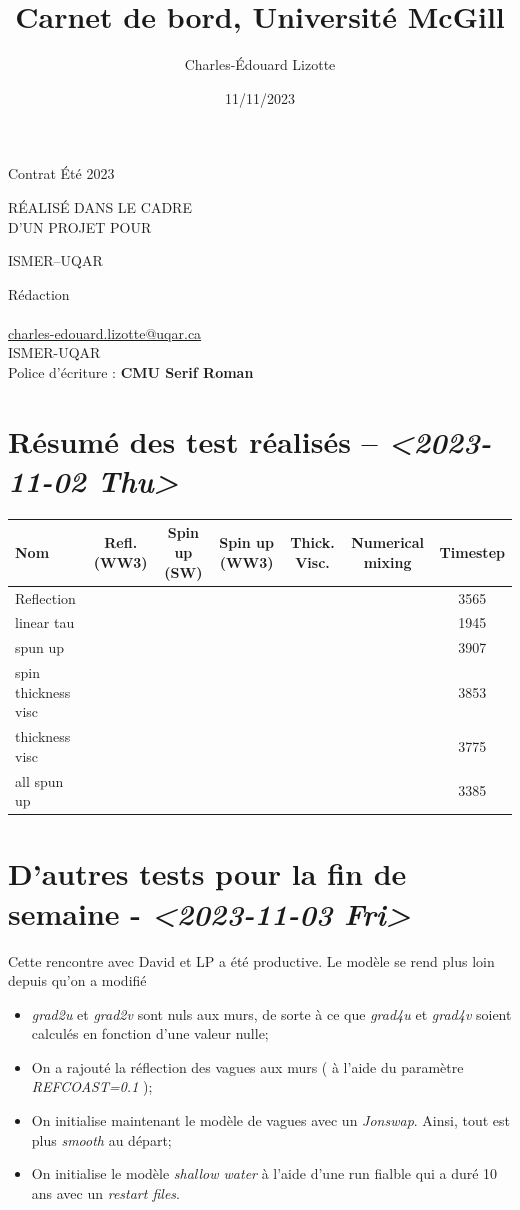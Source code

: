 \documentclass[10pt]{report}
\author{Charles-Édouard Lizotte}
\date{11/11/2023}
\title{Carnet de bord, Université McGill}
\makeatletter
\numberwithin{equation}{section}
\newcommand{\cmark}{\ding{52}}
\newcommand{\xmark}{\ding{55}}
\newcommand{\mytitlepage}{
\begin{titlepage}
\begin{center}
{\Huge Contrat Été 2023 \par}
\vspace{2cm}
{\Huge \MakeUppercase{\thetitle} \par}
\vspace{2cm}
RÉALISÉ DANS LE CADRE\\ D'UN PROJET POUR \par
\vspace{2cm}
{\Huge ISMER--UQAR \par}
\vspace{2cm}
{\thedate}
\end{center}
\vfill
Rédaction \\
{\theauthor}\\
\url{charles-edouard.lizotte@uqar.ca}\\
ISMER-UQAR\\
Police d'écriture : \textbf{CMU Serif Roman}
\end{titlepage}
}
\makeatother
\begin{document}
\mytitlepage
\tableofcontents\newpage

\section{Résumé des test réalisés -- \textit{<2023-11-02 Thu>}}
\label{sec:org900422d}
\begin{center}
\begin{tabular}{lcccccc}
Nom & Refl. (WW3) & Spin up (SW) & Spin up (WW3) & Thick. Visc. & Numerical mixing & Timestep\\[0pt]
\hline
\hline
Reflection & \cmark & \xmark & \cmark & \xmark & \cmark & 3565\\[0pt]
linear tau & \xmark & \xmark & \xmark & \xmark & \cmark & 1945\\[0pt]
spun up & \xmark & \cmark & \xmark & \xmark & \cmark & 3907\\[0pt]
spin thickness visc & \xmark & \cmark & \xmark & \cmark & \xmark & 3853\\[0pt]
thickness visc & \xmark & \xmark & \xmark & \cmark & \xmark & 3775\\[0pt]
all spun up & \cmark & \cmark & \cmark & \xmark & \xmark & 3385\\[0pt]
\hline
\end{tabular}
\end{center}



\section{D'autres tests pour la fin de semaine - \textit{<2023-11-03 Fri>}}
\label{sec:org1665904}

Cette rencontre avec David et LP a été productive.
Le modèle se rend plus loin depuis qu'on a modifié
\begin{itemize}
\item \emph{grad2u} et \emph{grad2v} sont nuls aux murs, de sorte à ce que \emph{grad4u} et \emph{grad4v} soient calculés en fonction d'une valeur nulle;
\item On a rajouté la réflection des vagues aux murs ( à l'aide du paramètre \emph{REFCOAST=0.1} );
\item On initialise maintenant le modèle de vagues avec un \emph{Jonswap}.
Ainsi, tout est plus \emph{smooth} au départ;
\item On initialise le modèle \emph{shallow water} à l'aide d'une run fialble qui a duré 10 ans avec un \emph{restart files}.
\end{itemize}
\end{document}
